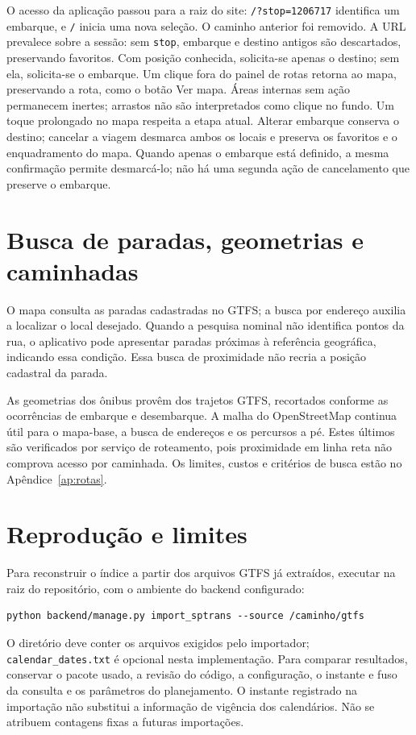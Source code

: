 \documentclass[12pt,oneside,a4paper,brazil,chapter=TITLE]{abntex2}
\let\papsection\section
\renewcommand{\section}{\clearpage\papsection}
\begin{document}
\begin{apendicesenv}
O acesso da aplicação passou para a raiz do site: \texttt{/?stop=1206717} identifica um embarque, e \texttt{/} inicia uma nova seleção. O caminho anterior foi removido. A URL prevalece sobre a sessão: sem \texttt{stop}, embarque e destino antigos são descartados, preservando favoritos. Com posição conhecida, solicita-se apenas o destino; sem ela, solicita-se o embarque. Um clique fora do painel de rotas retorna ao mapa, preservando a rota, como o botão Ver mapa. Áreas internas sem ação permanecem inertes; arrastos não são interpretados como clique no fundo. Um toque prolongado no mapa respeita a etapa atual. Alterar embarque conserva o destino; cancelar a viagem desmarca ambos os locais e preserva os favoritos e o enquadramento do mapa. Quando apenas o embarque está definido, a mesma confirmação permite desmarcá-lo; não há uma segunda ação de cancelamento que preserve o embarque.


\section{Busca de paradas, geometrias e caminhadas}
O mapa consulta as paradas cadastradas no GTFS; a busca por endereço auxilia a localizar o local desejado. Quando a pesquisa nominal não identifica pontos da rua, o aplicativo pode apresentar paradas próximas à referência geográfica, indicando essa condição. Essa busca de proximidade não recria a posição cadastral da parada.

As geometrias dos ônibus provêm dos trajetos GTFS, recortados conforme as ocorrências de embarque e desembarque. A malha do OpenStreetMap continua útil para o mapa-base, a busca de endereços e os percursos a pé. Estes últimos são verificados por serviço de roteamento, pois proximidade em linha reta não comprova acesso por caminhada. Os limites, custos e critérios de busca estão no Apêndice~\ref{ap:rotas}.

\section{Reprodução e limites}
Para reconstruir o índice a partir dos arquivos GTFS já extraídos, executar na raiz do repositório, com o ambiente do backend configurado:
\begin{verbatim}
python backend/manage.py import_sptrans --source /caminho/gtfs
\end{verbatim}
O diretório deve conter os arquivos exigidos pelo importador; \texttt{calendar\_dates.txt} é opcional nesta implementação. Para comparar resultados, conservar o pacote usado, a revisão do código, a configuração, o instante e fuso da consulta e os parâmetros do planejamento. O instante registrado na importação não substitui a informação de vigência dos calendários. Não se atribuem contagens fixas a futuras importações.


\end{apendicesenv}
\end{document}
